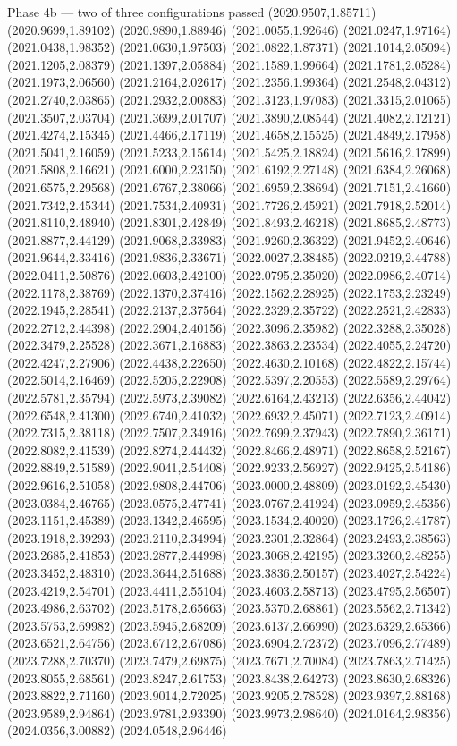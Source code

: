 \documentclass[aspectratio=169,10pt]{beamer}
\begin{document}
\begin{frame}[t]{Phase 4b — two of three configurations passed}
(2020.9507,1.85711) (2020.9699,1.89102) (2020.9890,1.88946) (2021.0055,1.92646) (2021.0247,1.97164) (2021.0438,1.98352) (2021.0630,1.97503) (2021.0822,1.87371) (2021.1014,2.05094) (2021.1205,2.08379) (2021.1397,2.05884) (2021.1589,1.99664) (2021.1781,2.05284) (2021.1973,2.06560) (2021.2164,2.02617) (2021.2356,1.99364) (2021.2548,2.04312) (2021.2740,2.03865) (2021.2932,2.00883) (2021.3123,1.97083) (2021.3315,2.01065) (2021.3507,2.03704) (2021.3699,2.01707) (2021.3890,2.08544) (2021.4082,2.12121) (2021.4274,2.15345) (2021.4466,2.17119) (2021.4658,2.15525) (2021.4849,2.17958) (2021.5041,2.16059) (2021.5233,2.15614) (2021.5425,2.18824) (2021.5616,2.17899) (2021.5808,2.16621) (2021.6000,2.23150) (2021.6192,2.27148) (2021.6384,2.26068) (2021.6575,2.29568) (2021.6767,2.38066) (2021.6959,2.38694) (2021.7151,2.41660) (2021.7342,2.45344) (2021.7534,2.40931) (2021.7726,2.45921) (2021.7918,2.52014) (2021.8110,2.48940) (2021.8301,2.42849) (2021.8493,2.46218) (2021.8685,2.48773) (2021.8877,2.44129) (2021.9068,2.33983) (2021.9260,2.36322) (2021.9452,2.40646) (2021.9644,2.33416) (2021.9836,2.33671) (2022.0027,2.38485) (2022.0219,2.44788) (2022.0411,2.50876) (2022.0603,2.42100) (2022.0795,2.35020) (2022.0986,2.40714) (2022.1178,2.38769) (2022.1370,2.37416) (2022.1562,2.28925) (2022.1753,2.23249) (2022.1945,2.28541) (2022.2137,2.37564) (2022.2329,2.35722) (2022.2521,2.42833) (2022.2712,2.44398) (2022.2904,2.40156) (2022.3096,2.35982) (2022.3288,2.35028) (2022.3479,2.25528) (2022.3671,2.16883) (2022.3863,2.23534) (2022.4055,2.24720) (2022.4247,2.27906) (2022.4438,2.22650) (2022.4630,2.10168) (2022.4822,2.15744) (2022.5014,2.16469) (2022.5205,2.22908) (2022.5397,2.20553) (2022.5589,2.29764) (2022.5781,2.35794) (2022.5973,2.39082) (2022.6164,2.43213) (2022.6356,2.44042) (2022.6548,2.41300) (2022.6740,2.41032) (2022.6932,2.45071) (2022.7123,2.40914) (2022.7315,2.38118) (2022.7507,2.34916) (2022.7699,2.37943) (2022.7890,2.36171) (2022.8082,2.41539) (2022.8274,2.44432) (2022.8466,2.48971) (2022.8658,2.52167) (2022.8849,2.51589) (2022.9041,2.54408) (2022.9233,2.56927) (2022.9425,2.54186) (2022.9616,2.51058) (2022.9808,2.44706) (2023.0000,2.48809) (2023.0192,2.45430) (2023.0384,2.46765) (2023.0575,2.47741) (2023.0767,2.41924) (2023.0959,2.45356) (2023.1151,2.45389) (2023.1342,2.46595) (2023.1534,2.40020) (2023.1726,2.41787) (2023.1918,2.39293) (2023.2110,2.34994) (2023.2301,2.32864) (2023.2493,2.38563) (2023.2685,2.41853) (2023.2877,2.44998) (2023.3068,2.42195) (2023.3260,2.48255) (2023.3452,2.48310) (2023.3644,2.51688) (2023.3836,2.50157) (2023.4027,2.54224) (2023.4219,2.54701) (2023.4411,2.55104) (2023.4603,2.58713) (2023.4795,2.56507) (2023.4986,2.63702) (2023.5178,2.65663) (2023.5370,2.68861) (2023.5562,2.71342) (2023.5753,2.69982) (2023.5945,2.68209) (2023.6137,2.66990) (2023.6329,2.65366) (2023.6521,2.64756) (2023.6712,2.67086) (2023.6904,2.72372) (2023.7096,2.77489) (2023.7288,2.70370) (2023.7479,2.69875) (2023.7671,2.70084) (2023.7863,2.71425) (2023.8055,2.68561) (2023.8247,2.61753) (2023.8438,2.64273) (2023.8630,2.68326) (2023.8822,2.71160) (2023.9014,2.72025) (2023.9205,2.78528) (2023.9397,2.88168) (2023.9589,2.94864) (2023.9781,2.93390) (2023.9973,2.98640) (2024.0164,2.98356) (2024.0356,3.00882) (2024.0548,2.96446) 
\end{frame}
\end{document}
